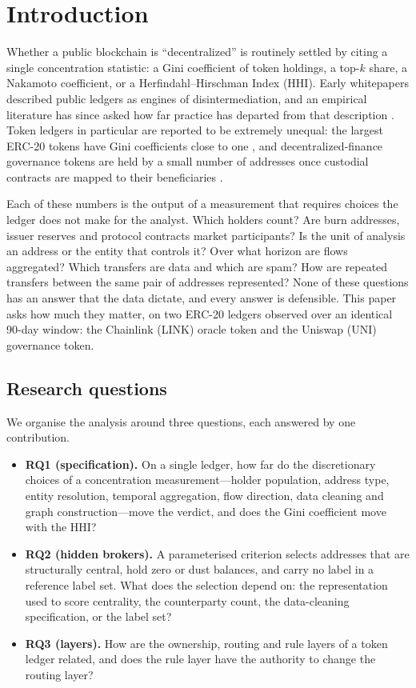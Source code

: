\section{Introduction}
\label{sec:intro}

Whether a public blockchain is ``decentralized'' is routinely settled by
citing a single concentration statistic: a Gini coefficient of token
holdings, a top-$k$ share, a Nakamoto coefficient, or a
Herfindahl--Hirschman Index (HHI). Early whitepapers
\cite{nakamoto2008bitcoin, wood2014ethereum} described public ledgers as
engines of disintermediation, and an empirical literature has since asked
how far practice has departed from that description
\cite{srinivasan2017quantifying, sai2021taxonomy, ovezik2022sok,
campajola2022evolution}. Token ledgers in particular are reported to be
extremely unequal: the largest ERC-20 tokens have Gini coefficients close
to one \cite{sai2021wealth}, and decentralized-finance governance tokens are
held by a small number of addresses once custodial contracts are mapped to
their beneficiaries \cite{nadler2022defi}.

Each of these numbers is the output of a measurement that requires choices
the ledger does not make for the analyst. Which holders count? Are burn
addresses, issuer reserves and protocol contracts market participants? Is
the unit of analysis an address or the entity that controls it? Over what
horizon are flows aggregated? Which transfers are data and which are spam?
How are repeated transfers between the same pair of addresses represented?
None of these questions has an answer that the data dictate, and every
answer is defensible. This paper asks how much they matter, on two ERC-20
ledgers observed over an identical 90-day window: the Chainlink (LINK)
oracle token and the Uniswap (UNI) governance token.

\subsection{Research questions}
\label{sec:rq-list}
We organise the analysis around three questions, each answered by one
contribution.
\begin{itemize}
  \item \textbf{RQ1 (specification).} On a single ledger, how far do the
  discretionary choices of a concentration measurement---holder population,
  address type, entity resolution, temporal aggregation, flow direction,
  data cleaning and graph construction---move the verdict, and does the
  Gini coefficient move with the HHI?
  \item \textbf{RQ2 (hidden brokers).} A parameterised criterion selects
  addresses that are structurally central, hold zero or dust balances, and
  carry no label in a reference label set. What does the selection depend on: the
  representation used to score centrality, the counterparty count, the
  data-cleaning specification, or the label set?
  \item \textbf{RQ3 (layers).} How are the ownership, routing and rule
  layers of a token ledger related, and does the rule layer have the
  authority to change the routing layer?
\end{itemize}

